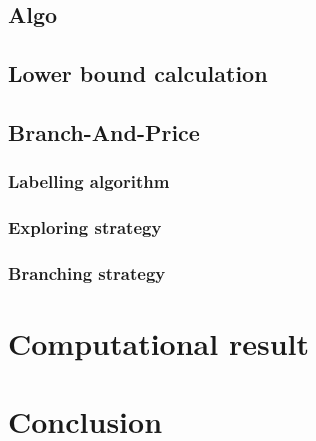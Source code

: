 \documentclass{article}
\begin{document}
\subsection{Algo}
\subsection{Lower bound calculation}
\subsection{Branch-And-Price}
\subsubsection{Labelling algorithm}
\subsubsection{Exploring strategy}
\subsubsection{Branching strategy}

\section{Computational result}

\section{Conclusion}
\end{document}
